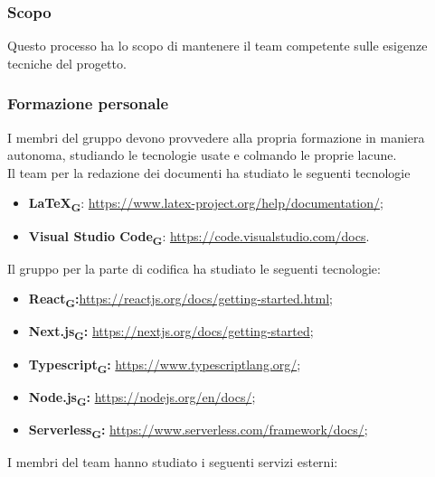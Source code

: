 \subsubsection{Scopo}
Questo processo ha lo scopo di mantenere il team competente sulle esigenze tecniche del progetto.
\subsubsection{Formazione personale}
I membri del gruppo devono provvedere alla propria formazione in maniera autonoma, studiando le tecnologie usate e colmando le proprie lacune.\\
Il team per la redazione dei documenti ha studiato le seguenti tecnologie
\begin{itemize}
    \item \textbf{\LaTeX\textsubscript{\textbf{G}}}: \url{https://www.latex-project.org/help/documentation/};
    \item \textbf{Visual Studio Code}\textsubscript{\textbf{G}}: \url{https://code.visualstudio.com/docs}.
\end{itemize}
Il gruppo per la parte di codifica ha studiato le seguenti tecnologie:
\begin{itemize}
    \item \textbf{React\textsubscript{\textbf{G}}:}\href{https://reactjs.org/docs/getting-started.html}{https://reactjs.org/docs/getting-started.html};
    \item \textbf{Next.js\textsubscript{\textbf{G}}:} \href{https://nextjs.org/docs/getting-started}{https://nextjs.org/docs/getting-started};
    \item \textbf{Typescript\textsubscript{\textbf{G}}:} \href{https://www.typescriptlang.org/}{https://www.typescriptlang.org/};
    \item \textbf{Node.js\textsubscript{\textbf{G}}:} \href{https://nodejs.org/en/docs/}{https://nodejs.org/en/docs/};
    \item \textbf{Serverless\textsubscript{\textbf{G}}:} \href{https://www.serverless.com/framework/docs/}{https://www.serverless.com/framework/docs/};
\end{itemize}
I membri del team hanno studiato i seguenti servizi esterni:
